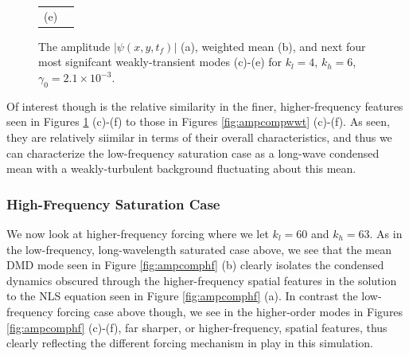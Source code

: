 \documentclass[aps,prl,preprint,groupedaddress]{revtex4-1}
\begin{document}
\begin{figure}[!ht]
\begin{tabular}{cc}
(e) & 
\end{tabular}
\caption{The amplitude $\left|\psi(x,y,t_{f})\right|$ (a), weighted mean (b), and next four most signifcant weakly-transient modes (c)-(e) for $k_{l}=4$, $k_{h}=6$, $\gamma_{0}=2.1\times 10^{-3}$. }
\label{fig:ampcomplf}
\end{figure}

Of interest though is the relative similarity in the finer, higher-frequency features seen in Figures \ref{fig:ampcomplf} (c)-(f) to those in Figures \ref{fig:ampcompwwt} (c)-(f).  As seen, they are relatively siimilar in terms of their overall characteristics, and thus we can characterize the low-frequency saturation case as a long-wave condensed mean with a weakly-turbulent background fluctuating about this mean.  

\subsubsection*{High-Frequency Saturation Case}
We now look at higher-frequency forcing where we let $k_{l}=60$ and $k_{h}=63$.  As in the low-frequency, long-wavelength saturated case above, we see that the mean DMD mode seen in Figure \ref{fig:ampcomphf} (b) clearly isolates the condensed dynamics obscured through the higher-frequency spatial features in the solution to the NLS equation seen in Figure \ref{fig:ampcomphf} (a).  In contrast the low-frequency forcing case above though, we see in the higher-order modes in Figures \ref{fig:ampcomphf} (c)-(f), far sharper, or higher-frequency, spatial features, thus clearly reflecting the different forcing mechanism in play in this simulation.   
\end{document}
